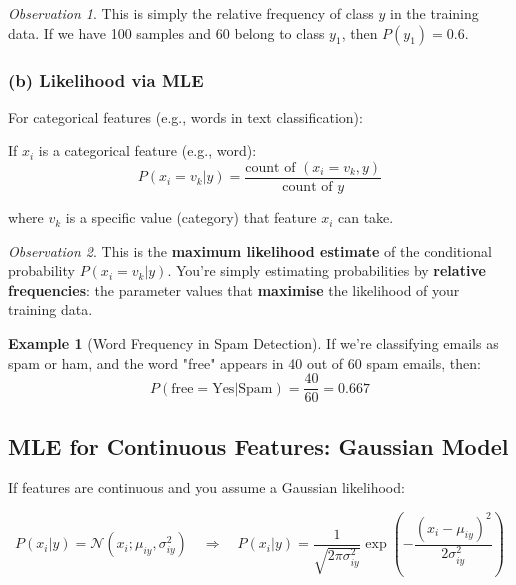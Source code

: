 \documentclass[11pt,a4paper]{article}
\theoremstyle{definition}
\newtheorem{example}{Example}[section]
\theoremstyle{plain}
\theoremstyle{remark}
\newtheorem*{observation}{Observation}
\begin{document}
\begin{observation}
This is simply the relative frequency of class $y$ in the training data. If we have 100 samples and 60 belong to class $y_1$, then $P(y_1) = 0.6$.
\end{observation}

\subsubsection{(b) Likelihood via MLE}

For categorical features (e.g., words in text classification):

\begin{tcolorbox}[colback=orange!5!white,colframe=orange!75!black,title=\textbf{Likelihood Estimation for Categorical Features}]
If $x_i$ is a categorical feature (e.g., word):
\[
P(x_i = v_k | y) = \frac{\text{count of } (x_i = v_k, y)}{\text{count of } y}
\]

where $v_k$ is a specific value (category) that feature $x_i$ can take.
\end{tcolorbox}

\begin{observation}
This is the \textbf{maximum likelihood estimate} of the conditional probability $P(x_i = v_k | y)$. You're simply estimating probabilities by \textbf{relative frequencies}: the parameter values that \textbf{maximise} the likelihood of your training data.
\end{observation}

\begin{example}[Word Frequency in Spam Detection]
If we're classifying emails as spam or ham, and the word "free" appears in 40 out of 60 spam emails, then:
\[
P(\text{free} = \text{Yes} | \text{Spam}) = \frac{40}{60} = 0.667
\]
\end{example}

\subsection{MLE for Continuous Features: Gaussian Model}

If features are continuous and you assume a Gaussian likelihood:

\begin{equation}
P(x_i | y) = \mathcal{N}(x_i; \mu_{iy}, \sigma_{iy}^2) \quad \Rightarrow \quad P(x_i | y) = \frac{1}{\sqrt{2\pi\sigma_{iy}^2}} \exp\left(-\frac{(x_i - \mu_{iy})^2}{2\sigma_{iy}^2}\right)
\end{equation}
\end{document}
